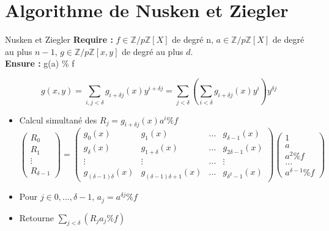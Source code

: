 \documentclass[10pt,a4paper]{beamer}
\begin{document}
\section{Algorithme de Nusken et Ziegler}
\begin{frame}
    \tableofcontents[currentsection]
\end{frame}

\begin{frame}    
    \begin{block}{Nusken et Ziegler}
        \textbf{Require :} $f \in \mathbb{Z}/p\mathbb{Z}[X]$ de degré n, $a \in \mathbb{Z}/p\mathbb{Z}[X]$ de degré au plus $n-1$, $g \in \mathbb{Z}/p\mathbb{Z}[x,y]$ de degré au plus $d$. \\
        \textbf{Ensure :} g(a) \% f
    \end{block}

    \[
    g(x,y) = \sum_{i,j<\delta}g_{i+\delta j}(x)y^{i+\delta j} = \sum_{j<\delta} \left( \sum_{i<\delta} g_{i+\delta j}(x)y^i \right) y^{\delta j}     
    \]

    \begin{itemize}
        \item Calcul simultané des $R_j = g_{i+\delta j}(x)a^i \%f $
            \[
            \begin{pmatrix}
                R_0 \\
                R_1 \\
                \vdots \\
                R_{\delta-1}
            \end{pmatrix}
            =
            \begin{pmatrix}
                g_0(x)&g_1(x)&...&g_{\delta -1}(x) \\
                g_{\delta}(x)&g_{1+\delta}(x)&...&g_{2\delta-1}(x) \\
                \vdots&\vdots&...&\vdots \\
                g_{(\delta-1)\delta}(x)&g_{(\delta-1)\delta+1}(x)&...&g_{\delta^2-1}(x)
            \end{pmatrix}
            \begin{pmatrix}
                1 \\
                a \\
                a^2 \%f \\
                ... \\
                a^{\delta-1} \%f
            \end{pmatrix}
            \]
        \item Pour $j\in{0,...,\delta-1}$, $a_j=a^{\delta j}\% f$
        \item Retourne $\sum_{j<\delta}(R_ja_j \% f)$
    \end{itemize}

    
\end{frame}
\end{document}
